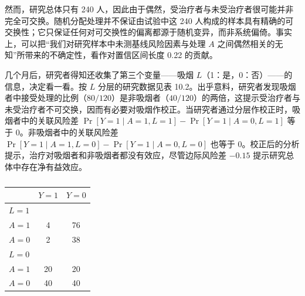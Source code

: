 然而，研究总体只有 240 人，因此由于偶然，受治疗者与未受治疗者很可能并非完全可交换。随机分配处理并不保证由试验中这 240 人构成的样本具有精确的可交换性；它只保证任何对可交换性的偏离都源于随机变异，而非系统偏倚。事实上，可以把“我们对研究样本中未测基线风险因素与处理 $A$ 之间偶然相关的无知”所带来的不确定性，看作对置信区间长度 0.22 的贡献。

几个月后，研究者得知还收集了第三个变量——吸烟 $L$（1：是，0：否）——的信息，决定看一看。按 $L$ 分层的研究数据见表 10.2。出乎意料，研究者发现吸烟者中接受处理的比例（$80/120$）是非吸烟者（$40/120$）的两倍，这提示受治疗者与未受治疗者不可交换，因而有必要对吸烟作校正。当研究者通过分层作校正时，吸烟者中的关联风险差 $\Pr[Y=1\mid A=1,L=1]-\Pr[Y=1\mid A=0,L=1]$ 等于 0。非吸烟者中的关联风险差 $\Pr[Y=1\mid A=1,L=0]-\Pr[Y=1\mid A=0,L=0]$ 也等于 0。校正后的分析提示，治疗对吸烟者和非吸烟者都没有效应，尽管边际风险差 $-0.15$ 提示研究总体中存在净有益效应。


\begin{table}[htbp]
\centering
\caption{}
\label{tab:10.2}
\small
\begin{tabular}{lcc}
\toprule
& $Y=1$ & $Y=0$\\
\midrule
\multicolumn{3}{l}{$L=1$}\\
$A=1$ & 4 & 76\\
$A=0$ & 2 & 38\\
\midrule
\multicolumn{3}{l}{$L=0$}\\
$A=1$ & 20 & 20\\
$A=0$ & 40 & 40\\
\bottomrule
\end{tabular}
\end{table}

